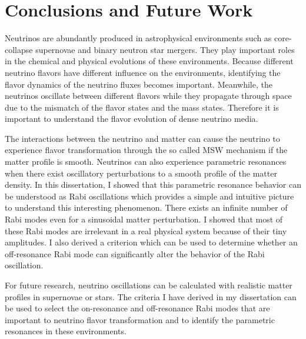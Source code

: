 \chapter{\label{chap:conclusion}Conclusions and Future Work}

Neutrinos are abundantly produced in astrophysical environments such as core-collapse supernovae and binary neutron star mergers. They play important roles in the chemical and physical evolutions of these environments. Because different neutrino flavors have different influence on the environments, identifying the flavor dynamics of the neutrino fluxes becomes important. Meanwhile, the neutrinos oscillate between different flavors while they propagate through space due to the mismatch of the flavor states and the mass states. Therefore it is important to understand the flavor evolution of dense neutrino media.

The interactions between the neutrino and matter can cause the neutrino to experience flavor transformation through the so called MSW mechanism if the matter profile is smooth. Neutrinos can also experience parametric resonances when there exist oscillatory perturbations to a smooth profile of the matter density. In this dissertation, I showed that this parametric resonance behavior can be understood as Rabi oscillations which provides a simple and intuitive picture to understand this interesting phenomenon. There exists an infinite number of Rabi modes even for a sinusoidal matter perturbation. I showed that most of these Rabi modes are irrelevant in a real physical system because of their tiny amplitudes. I also derived a criterion which can be used to determine whether an off-resonance Rabi mode can significantly alter the behavior of the Rabi oscillation.

For future research, neutrino oscillations can be calculated with realistic matter profiles in supernovae or stars. The criteria I have derived in my dissertation can be used to select the on-resonance and off-resonance Rabi modes that are important to neutrino flavor transformation and to identify the parametric resonances in these environments.

